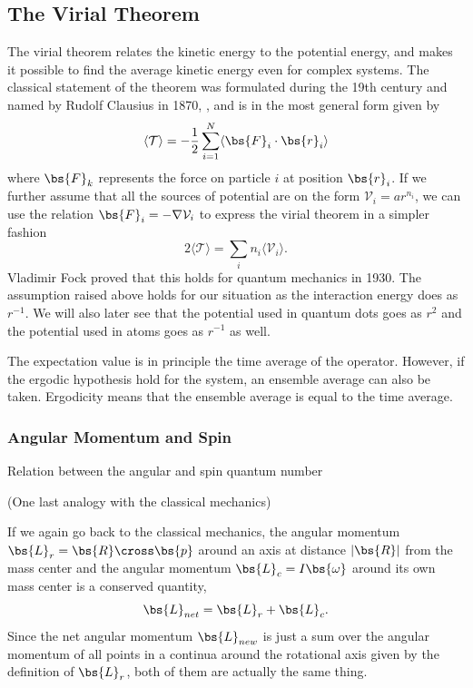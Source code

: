 \subsection{The Virial Theorem} \label{sec:virial}
The virial theorem relates the kinetic energy to the potential energy, and makes it possible to find the average kinetic energy even for complex systems. The classical statement of the theorem was formulated during the 19th century and named by Rudolf Clausius in 1870, \cite{clausius_xvi._1870}, and is in the most general form given by 
\begin{equation}
\langle\mathcal{T}\rangle=-\frac{1}{2}\sum_{i=1}^N\langle\bs{F}_i\cdot\bs{r}_i\rangle
\end{equation}
where $\bs{F}_k$ represents the force on particle $i$ at position $\bs{r}_i$. If we further assume that all the sources of potential are on the form $\mathcal{V}_i=ar^{n_i}$, we can use the relation $\bs{F}_i=-\nabla \mathcal{V}_i$ to express the virial theorem in a simpler fashion
\begin{equation}
2\langle \mathcal{T} \rangle = \sum_{i}n_i\langle \mathcal{V}_{i} \rangle.
\end{equation}
Vladimir Fock proved that this holds for quantum mechanics in 1930. \cite{fock_bemerkung_1930} The assumption raised above holds for our situation as the interaction energy does as $r^{-1}$. We will also later see that the potential used in quantum dots goes as $r^2$ and the potential used in atoms goes as $r^{-1}$ as well.

The expectation value is in principle the time average of the operator. However, if the ergodic hypothesis hold for the system, an ensemble average can also be taken. Ergodicity means that the ensemble average is equal to the time average. \cite{flyvbjerg_error_1989}

\iffalse
\subsubsection*{Angular Momentum and Spin}
Relation between the angular and spin quantum number

(One last analogy with the classical mechanics)

If we again go back to the classical mechanics, the angular momentum $\bs{L}_r=\bs{R}\cross\bs{p}$ around an axis at distance $|\bs{R}|$ from the mass center and the angular momentum $\bs{L}_c=I\bs{\omega}$ around its own mass center is a conserved quantity,
\begin{equation}
\bs{L}_{net} = \bs{L}_r+\bs{L}_c.
\end{equation}
Since the net angular momentum $\bs{L}_{new}$ is just a sum over the angular momentum of all points in a continua around the rotational axis given by the definition of $\bs{L}_r$, both of them are actually the same thing.

